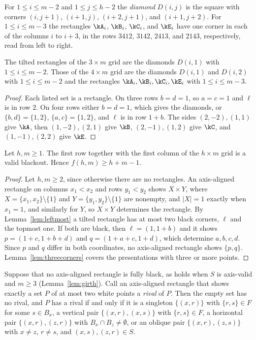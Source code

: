For $1\le i\le m-2$ and $1\le j\le h-2$ the \emph{diamond} $D(i,j)$ is the square with corners $(i,j+1)$, $(i+1,j)$, $(i+2,j+1)$, and $(i+1,j+2)$. For $1\le i\le m-3$ the rectangles $\kA_i$, $\kB_i$, $\kC_i$, and $\kE_i$ have one corner in each of the columns $i$ to $i+3$, in the rows $3412$, $3142$, $2413$, and $2143$, respectively, read from left to right.

\begin{lemma}\label{lem:tilted-narrow}
The tilted rectangles of the $3\times m$ grid are the diamonds $D(i,1)$ with $1\le i\le m-2$. Those of the $4\times m$ grid are the diamonds $D(i,1)$ and $D(i,2)$ with $1\le i\le m-2$ and the rectangles $\kA_i,\kB_i,\kC_i,\kE_i$ with $1\le i\le m-3$.
\end{lemma}

\begin{proof}
Each listed set is a rectangle. On three rows $b=d=1$, so $a=c=1$ and $\ell$ is in row $2$. On four rows either $b=d=1$, which gives the diamonds, or $\{b,d\}=\{1,2\}$, $\{a,c\}=\{1,2\}$, and $\ell$ is in row $1+b$. The sides $(2,-2),(1,1)$ give $\kA$, then $(1,-2),(2,1)$ give $\kB$, $(2,-1),(1,2)$ give $\kC$, and $(1,-1),(2,2)$ give $\kE$.
\end{proof}

\begin{lemma}\label{lem:cross}
Let $h,m\ge1$. The first row together with the first column of the $h\times m$ grid is a valid blackout. Hence $f(h,m)\ge h+m-1$.
\end{lemma}

\begin{proof}
Let $h,m\ge2$, since otherwise there are no rectangles. An axis-aligned rectangle on columns $x_1<x_2$ and rows $y_1<y_2$ shows $X\times Y$, where $X=\{x_1,x_2\}\setminus\{1\}$ and $Y=\{y_1,y_2\}\setminus\{1\}$ are nonempty, and $|X|=1$ exactly when $x_1=1$, and similarly for $Y$, so $X\times Y$ determines the rectangle. By Lemma~\ref{lem:leftmost} a tilted rectangle has at most two black corners, $\ell$ and the topmost one. If both are black, then $\ell=(1,1+b)$ and it shows $p=(1+c,1+b+d)$ and $q=(1+a+c,1+d)$, which determine $a,b,c,d$. Since $p$ and $q$ differ in both coordinates, no axis-aligned rectangle shows $\{p,q\}$. Lemma~\ref{lem:threecorners} covers the presentations with three or more points.
\end{proof}

\begin{lemma}\label{lem:rival}
Suppose that no axis-aligned rectangle is fully black, as holds when $S$ is axis-valid and $m\ge3$ (Lemma~\ref{lem:girth}). Call an axis-aligned rectangle that shows exactly a set $P$ of at most two white points a \emph{rival} of $P$. Then the empty set has no rival, and $P$ has a rival if and only if it is a singleton $\{(x,r)\}$ with $\{r,s\}\in F$ for some $s\in B_x$, a vertical pair $\{(x,r),(x,s)\}$ with $\{r,s\}\in F$, a horizontal pair $\{(x,r),(z,r)\}$ with $B_x\cap B_z\ne\emptyset$, or an oblique pair $\{(x,r),(z,s)\}$ with $x\ne z$, $r\ne s$, and $(x,s),(z,r)\in S$.
\end{lemma}

